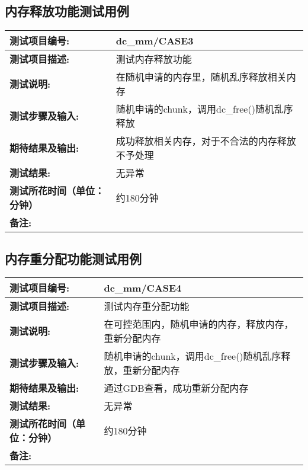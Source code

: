 \subsection {内存释放功能测试用例}
\begin{table}[H]
\centering
\begin{tabular}{|p{8em}|p{22em}|}
\hline
\textbf{测试项目编号:}&dc\_mm/CASE3\\
\hline
\textbf{测试项目描述:}&测试内存释放功能\\
\hline
\textbf{测试说明:}&在随机申请的内存里，随机乱序释放相关内存\\
\hline
\textbf{测试步骤及输入:}&随机申请的chunk，调用dc\_free()随机乱序释放\\
\hline
\textbf{期待结果及输出:}&成功释放相关内存，对于不合法的内存释放不予处理\\
\hline
\textbf{测试结果:}&无异常\\
\hline
\textbf{测试所花时间（单位：分钟）}& 约180分钟\\
\hline
\textbf{备注:}& \\
\hline
\end{tabular}
\end{table}


\subsection {内存重分配功能测试用例}
\begin{table}[H]
\centering
\begin{tabular}{|p{8em}|p{22em}|}
\hline
\textbf{测试项目编号:}&dc\_mm/CASE4\\
\hline
\textbf{测试项目描述:}&测试内存重分配功能\\
\hline
\textbf{测试说明:}&在可控范围内，随机申请的内存，释放内存，重新分配内存\\
\hline
\textbf{测试步骤及输入:}&随机申请的chunk，调用dc\_free()随机乱序释放，重新分配内存\\
\hline
\textbf{期待结果及输出:}&通过GDB查看，成功重新分配内存\\
\hline
\textbf{测试结果:}&无异常\\
\hline
\textbf{测试所花时间（单位：分钟）}& 约180分钟\\
\hline
\textbf{备注:}& \\
\hline
\end{tabular}
\end{table}


